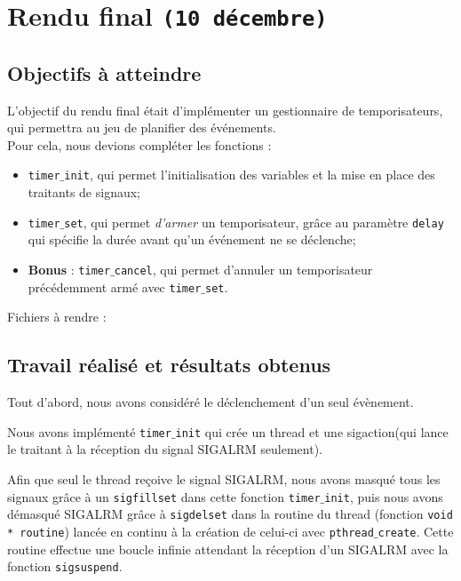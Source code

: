 \documentclass[a4paper, 12pt]{article}
\begin{document}
\newpage
\section{Rendu final \texttt{(10 décembre)}}
	\subsection{Objectifs à atteindre}
	L'objectif du rendu final était d'implémenter un gestionnaire de temporisateurs, qui permettra au jeu de planifier des événements. \\
	Pour cela, nous devions compléter les fonctions :
\begin{itemize}
	 \item \texttt{timer$\_$init}, qui permet l'initialisation des variables et la mise en place des traitants de signaux;
	 \item \texttt{timer$\_$set}, qui permet \textit{d'armer} un temporisateur, grâce au paramètre \texttt{delay} qui spécifie la durée avant qu'un événement ne se déclenche; 
	 \item \textbf{Bonus} : \texttt{timer$\_$cancel}, qui permet d'annuler un temporisateur précédemment armé avec \texttt{timer$\_$set}. \\
\end{itemize}

	Fichiers à rendre :
	
	

	\subsection{Travail réalisé et résultats obtenus} 
	Tout d'abord, nous avons considéré le déclenchement d'un seul évènement.
	
	Nous avons implémenté \texttt{timer$\_$init} qui crée un thread et une sigaction(qui lance le traitant à la réception du signal SIGALRM seulement).
	
	Afin que seul le thread reçoive le signal SIGALRM, nous avons masqué tous les signaux grâce à un \texttt{sigfillset} dans cette fonction \texttt{timer$\_$init}, puis nous avons démasqué SIGALRM grâce à \texttt{sigdelset} dans la routine du thread (fonction \texttt{void * routine}) lancée en continu à la création de celui-ci avec \texttt{pthread$\_$create}. Cette routine effectue une boucle infinie attendant la réception d'un SIGALRM avec la fonction \texttt{sigsuspend}. 
	
\end{document}
